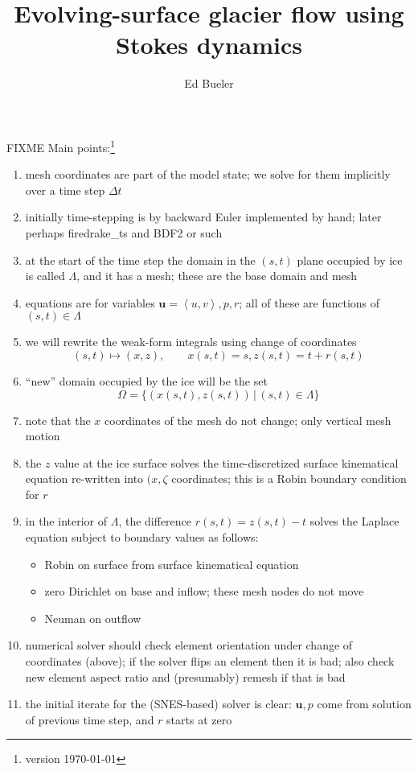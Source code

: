 \documentclass[letterpaper,final,12pt,reqno]{amsart}
\newcommand{\bu}{\mathbf{u}}
\begin{document}
\graphicspath{{figures/}}

\title{Evolving-surface glacier flow using Stokes dynamics}

\author{Ed Bueler}

\maketitle

\thispagestyle{empty}
\bigskip

FIXME Main points:\footnote{version \today}
\renewcommand{\labelenumi}{\arabic{enumi}.}
\begin{enumerate}
\item mesh coordinates are part of the model state; we solve for them implicitly over a time step $\Delta t$
\item initially time-stepping is by backward Euler implemented by hand; later perhaps firedrake\_ts and BDF2 or such
\item at the start of the time step the domain in the $(s,t)$ plane occupied by ice is called $\Lambda$, and it has a mesh; these are the base domain and mesh
\item equations are for variables $\bu=\left<u,v\right>,p,r$; all of these are functions of $(s,t) \in \Lambda$
\item we will rewrite the weak-form integrals using change of coordinates
    $$(s,t) \mapsto (x,z), \qquad x(s,t)=s, z(s,t)=t+r(s,t)$$
\item ``new'' domain occupied by the ice will be the set
    $$\Omega = \{(x(s,t),z(s,t)) \,\big|\, (s,t) \in \Lambda\}$$
\item note that the $x$ coordinates of the mesh do not change; only vertical mesh motion
\item the $z$ value at the ice surface solves the time-discretized surface kinematical equation re-written into $(x,\zeta$ coordinates; this is a Robin boundary condition for $r$
\item in the interior of $\Lambda$, the difference $r(s,t)=z(s,t)-t$ solves the Laplace equation subject to boundary values as follows:
    \begin{itemize}
    \item Robin on surface from surface kinematical equation
    \item zero Dirichlet on base and inflow; these mesh nodes do not move
    \item Neuman on outflow
    \end{itemize}
\item numerical solver should check element orientation under change of coordinates (above); if the solver flips an element then it is bad; also check new element aspect ratio and (presumably) remesh if that is bad
\item the initial iterate for the (SNES-based) solver is clear: $\bu,p$ come from solution of previous time step, and $r$ starts at zero
\end{enumerate}
\end{document}
